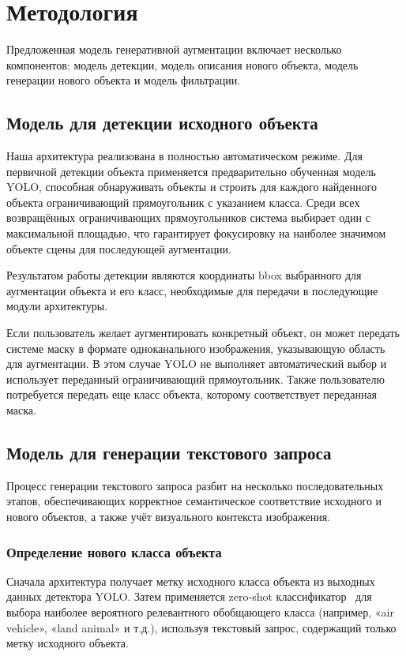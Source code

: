 \section{Методология}
Предложенная модель генеративной аугментации включает несколько компонентов: модель детекции, модель описания нового объекта, модель генерации нового объекта и модель фильтрации.

\subsection{Модель для детекции исходного объекта}
Наша архитектура реализована в полностью автоматическом режиме. Для первичной детекции объекта применяется предварительно обученная модель YOLO, способная обнаруживать объекты и строить для каждого найденного объекта ограничивающий прямоугольник с указанием класса. Среди всех возвращённых ограничивающих прямоугольников система выбирает один с максимальной площадью, что гарантирует фокусировку на наиболее значимом объекте сцены для последующей аугментации. 

Результатом работы детекции являются координаты bbox выбранного для аугментации объекта и его класс, необходимые для передачи в последующие модули архитектуры.

Если пользователь желает аугментировать конкретный объект, он может передать системе маску в формате одноканального изображения, указывающую область для аугментации. В этом случае YOLO не выполняет автоматический выбор и использует переданный ограничивающий прямоугольник. Также пользователю потребуется передать еще класс объекта, которому соответствует переданная маска.

\subsection{Модель для генерации текстового запроса}
Процесс генерации текстового запроса разбит на несколько последовательных этапов, обеспечивающих корректное семантическое соответствие исходного и нового объектов, а также учёт визуального контекста изображения.

\subsubsection{Определение нового класса объекта}
Сначала архитектура получает метку исходного класса объекта из выходных данных детектора YOLO. Затем применяется zero‐shot классификатор~\cite{DBLP:journals/corr/abs-1909-00161} для выбора наиболее вероятного релевантного обобщающего класса (например, «air vehicle», «land animal» и т.д.), используя текстовый запрос, содержащий только метку исходного объекта.

